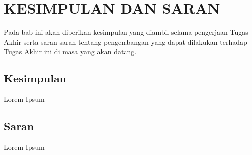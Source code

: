 \chapter{KESIMPULAN DAN SARAN}
\par Pada bab ini akan diberikan kesimpulan yang diambil selama pengerjaan Tugas Akhir serta saran-saran tentang pengembangan yang dapat dilakukan terhadap Tugas Akhir ini di masa yang akan datang.

\section{Kesimpulan}
\par Lorem Ipsum

\section{Saran}
\par Lorem Ipsum
